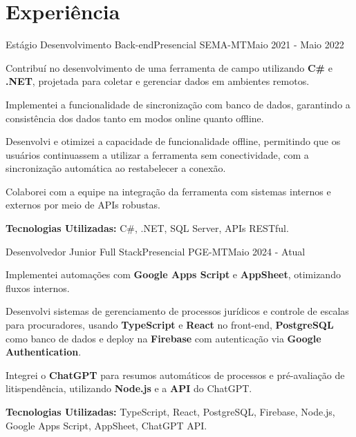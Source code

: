 \section{\textbf{Experiência}}
  \resumeSubHeadingListStart
    \resumeSubheading
      { Estágio Desenvolvimento Back-end}{Presencial}
      {SEMA-MT}{Maio 2021 - Maio 2022}
      \vspace{-2.0mm}
      \resumeItemListStart
        \item {Contribuí no desenvolvimento de uma ferramenta de campo utilizando \textbf{C\#} e \textbf{.NET}, projetada para coletar e gerenciar dados em ambientes remotos.}
        \item {Implementei a funcionalidade de sincronização com banco de dados, garantindo a consistência dos dados tanto em modos online quanto offline.}
        \item {Desenvolvi e otimizei a capacidade de funcionalidade offline, permitindo que os usuários continuassem a utilizar a ferramenta sem conectividade, com a sincronização automática ao restabelecer a conexão.}
        \item {Colaborei com a equipe na integração da ferramenta com sistemas internos e externos por meio de APIs robustas.}
        \item {\textbf{Tecnologias Utilizadas:} C\#, .NET, SQL Server, APIs RESTful.}
      \resumeItemListEnd


    \vspace{-3.0mm}
    
        \resumeSubheading
      { Desenvolvedor Junior Full Stack}{Presencial}
      {PGE-MT}{Maio 2024 - Atual}
      \vspace{-2.0mm}
      \resumeItemListStart
        \item {Implementei automações com \textbf{Google Apps Script} e \textbf{AppSheet}, otimizando fluxos internos.}
        \item {Desenvolvi sistemas de gerenciamento de processos jurídicos e controle de escalas para procuradores, usando \textbf{TypeScript} e \textbf{React} no front-end, \textbf{PostgreSQL} como banco de dados e deploy na \textbf{Firebase} com autenticação via \textbf{Google Authentication}.}
        \item {Integrei o \textbf{ChatGPT} para resumos automáticos de processos e pré-avaliação de litispendência, utilizando \textbf{Node.js} e a \textbf{API} do ChatGPT.}
        \item {\textbf{Tecnologias Utilizadas:} TypeScript, React, PostgreSQL, Firebase, Node.js, Google Apps Script, AppSheet, ChatGPT API.}
      \resumeItemListEnd

